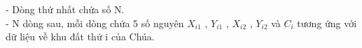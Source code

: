 - Dòng thứ nhất chứa số N.
\\- N dòng sau, mỗi dòng chứa 5 số nguyên $X_{i1}$ , $Y_{i1}$ , $X_{i2}$ , $Y_{i2}$ và $C_{i}$ tương ứng với dữ liệu về khu đất thứ i của Chúa.